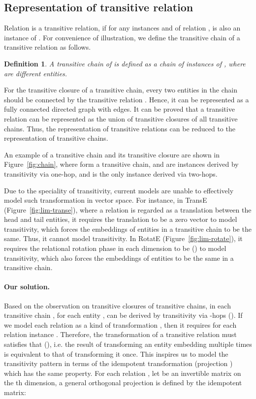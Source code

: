 \documentclass{article}
\newtheorem{definition}{Definition}
\begin{document}
\subsection{Representation of transitive relation}
Relation  is a transitive relation, if for any instances  and  of relation ,  is also an instance of . For convenience of illustration, we define the transitive chain of a transitive relation as follows.
\begin{definition}
A \emph{transitive chain} of  is defined as a chain of instances  of , where  are different entities.
\end{definition}
For the transitive closure of a transitive chain, every two entities in the chain should be connected by the transitive relation . Hence, it can be represented as a fully connected directed graph with  edges. It can be proved that a transitive relation can be represented as the union of transitive closures of all transitive chains. Thus, the representation of transitive relations can be reduced to the representation of transitive chains.

An example of a transitive chain and its transitive closure are shown in Figure~\ref{fig:chain}, where  form a transitive chain,  and  are instances derived by transitivity via one-hop, and  is the only instance derived via two-hops.

Due to the speciality of transitivity, current models are unable to effectively model such transformation in vector space. For instance, in TransE (Figure~\ref{fig:lim-transe}), where a relation is regarded as a translation between the head and tail entities, it requires the translation to be a zero vector to model transitivity, which forces the embeddings of entities in a transitive chain to be the same. Thus, it cannot model transitivity. In RotatE (Figure~\ref{fig:lim-rotate}), it requires the relational rotation phase  in each dimension to be  () to model transitivity, which also forces the embeddings of entities to be the same in a transitive chain.

\paragraph{Our solution.} Based on the observation on transitive closures of transitive chains, in each transitive chain , for each entity ,  can be derived by transitivity via -hops (). If we model each relation  as a kind of transformation , then it requires  for each relation instance .
Therefore, the transformation of a transitive relation must satisfies that  (), i.e. the result of transforming an entity embedding multiple times is equivalent to that of transforming it once. This inspires us to model the transitivity pattern in terms of the idempotent transformation (projection \cite{valenza2012linear}) which has the same property.
For each relation , let  be an invertible matrix on the th dimension, a general orthogonal projection is defined by the idempotent matrix:
\end{document}
